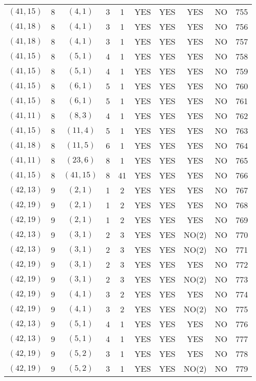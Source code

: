 \begin{longtable}{|c|c|c|c|c|c|c|c|c|c|}
$(41, 15)$ & 8 & $(4, 1)$ & 3 & 1 & YES & YES & YES & NO & 755\\
$(41, 18)$ & 8 & $(4, 1)$ & 3 & 1 & YES & YES & YES & NO & 756\\
$(41, 18)$ & 8 & $(4, 1)$ & 3 & 1 & YES & YES & YES & NO & 757\\
$(41, 15)$ & 8 & $(5, 1)$ & 4 & 1 & YES & YES & YES & NO & 758\\
$(41, 15)$ & 8 & $(5, 1)$ & 4 & 1 & YES & YES & YES & NO & 759\\
$(41, 15)$ & 8 & $(6, 1)$ & 5 & 1 & YES & YES & YES & NO & 760\\
$(41, 15)$ & 8 & $(6, 1)$ & 5 & 1 & YES & YES & YES & NO & 761\\
$(41, 11)$ & 8 & $(8, 3)$ & 4 & 1 & YES & YES & YES & NO & 762\\
$(41, 15)$ & 8 & $(11, 4)$ & 5 & 1 & YES & YES & YES & NO & 763\\
$(41, 18)$ & 8 & $(11, 5)$ & 6 & 1 & YES & YES & YES & NO & 764\\
$(41, 11)$ & 8 & $(23, 6)$ & 8 & 1 & YES & YES & YES & NO & 765\\
$(41, 15)$ & 8 & $(41, 15)$ & 8 & 41 & YES & YES & YES & NO & 766\\
$(42, 13)$ & 9 & $(2, 1)$ & 1 & 2 & YES & YES & YES & NO & 767\\
$(42, 19)$ & 9 & $(2, 1)$ & 1 & 2 & YES & YES & YES & NO & 768\\
$(42, 19)$ & 9 & $(2, 1)$ & 1 & 2 & YES & YES & YES & NO & 769\\
$(42, 13)$ & 9 & $(3, 1)$ & 2 & 3 & YES & YES & NO(2) & NO & 770\\
$(42, 13)$ & 9 & $(3, 1)$ & 2 & 3 & YES & YES & NO(2) & NO & 771\\
$(42, 19)$ & 9 & $(3, 1)$ & 2 & 3 & YES & YES & YES & NO & 772\\
$(42, 19)$ & 9 & $(3, 1)$ & 2 & 3 & YES & YES & NO(2) & NO & 773\\
$(42, 19)$ & 9 & $(4, 1)$ & 3 & 2 & YES & YES & YES & NO & 774\\
$(42, 19)$ & 9 & $(4, 1)$ & 3 & 2 & YES & YES & NO(2) & NO & 775\\
$(42, 13)$ & 9 & $(5, 1)$ & 4 & 1 & YES & YES & YES & NO & 776\\
$(42, 13)$ & 9 & $(5, 1)$ & 4 & 1 & YES & YES & YES & NO & 777\\
$(42, 19)$ & 9 & $(5, 2)$ & 3 & 1 & YES & YES & YES & NO & 778\\
$(42, 19)$ & 9 & $(5, 2)$ & 3 & 1 & YES & YES & NO(2) & NO & 779\\

\end{longtable}
